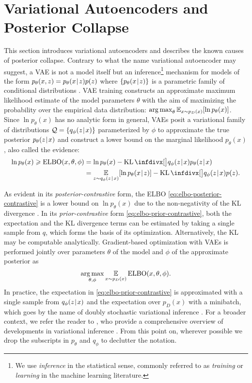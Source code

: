 \section{Variational Autoencoders and Posterior Collapse}
\label{sec:posterior-collapse}

This section introduces variational autoencoders and describes the known causes of posterior collapse.
Contrary to what the name variational autoencoder may suggest, a VAE is not a model itself but an inference\footnote{We use \emph{inference} in the statistical sense, commonly referred to as \emph{training} or \emph{learning} in the machine learning literature.} mechanism for models of the form $p_\theta(x,z)=p_\theta(x\hspace{0.08em}|\hspace{0.11em} z)p(z)$ where $\{p_\theta(x\hspace{0.08em}|\hspace{0.11em} z)\}$ is a parametric family of conditional distributions \citep{kingma2013auto}.
VAE training constructs an approximate maximum likelihood estimate of the model parameters $\theta$ with the aim of maximizing the probability over the empirical data distribution: $\operatorname*{arg\,max}_{\theta} \mathop{{}\mathbb{E}}_{x \sim p_D(x)}[ \ln p_\theta(x)]$.
Since $\ln p_\theta(x)$ has no analytic form in general, VAEs posit a variational family of distributions $\mathcal{Q} = \{q_\phi(z\hspace{0.08em}|\hspace{0.11em} x)\}$ parameterized by $\phi$ to approximate the true posterior $p_\theta(z\hspace{0.08em}|\hspace{0.11em} x)$ and construct a lower bound on the marginal likelihood $p_\theta(x)$, also called the evidence:
\begin{align}
\label{eq:elbo-posterior-contrastive}
\ln p_\theta(x) \geqslant \elbo(x, \theta, \phi)
&= \ln p_\theta(x) - \KL\Div[\big]{q_\phi(z\tmid x)}{p_\theta(z\tmid x)} \\
\label{eq:elbo-prior-contrastive}
&= \E_{z \sim q_\phi(z\tmid x)} [\ln p_\theta(x\tmid z)] - \KL\Div[\big]{q_\phi(z\tmid x)}{p(z)}.
\end{align}

As evident in its \emph{posterior-contrastive} form, the ELBO \eqref{eq:elbo-posterior-contrastive} is a lower bound on $\ln p_\theta(x)$ due to the non-negativity of the KL divergence \citep{kullback1951information}.
In its \emph{prior-contrastive} form \eqref{eq:elbo-prior-contrastive}, both the expectation and the KL divergence terms can be estimated by taking a single sample from $q$, which forms the basis of its optimization.
Alternatively, the KL may be computable analytically.
Gradient-based optimization with VAEs is performed jointly over parameters $\theta$ of the model and $\phi$ of the approximate posterior as
\begin{align*}
\operatorname*{arg\,max}_{\theta,\phi} \mathop{{}\mathbb{E}}_{x \sim p_D(x)} \operatorname{\mathrm{ELBO}}(x, \theta, \phi).
\end{align*}
In practice, the expectation in \eqref{eq:elbo-prior-contrastive} is approximated with a single sample from $q_\phi(z\hspace{0.08em}|\hspace{0.11em} x)$ and the expectation over $p_D(x)$ with a minibatch, which goes by the name of doubly stochastic variational inference \citep{titsias2014doubly}.
For a broader context, we refer the reader to \citet{zhang2018advances}, who provide a comprehensive overview of developments in variational inference \citep{jordan1999introduction}.
From this point on, wherever possible we drop the subscripts in $p_\theta$ and $q_\phi$ to declutter the notation.

